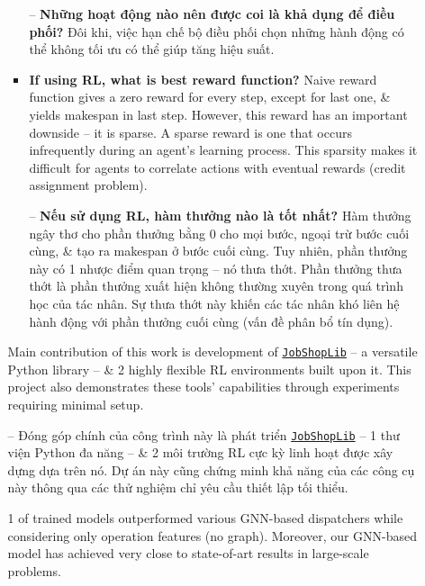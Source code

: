 \documentclass{article}
\begin{document}
\begin{itemize}
\begin{itemize}
\begin{itemize}
            -- {\bf Những hoạt động nào nên được coi là khả dụng để điều phối?} Đôi khi, việc hạn chế bộ điều phối chọn những hành động có thể không tối ưu có thể giúp tăng hiệu suất.
            \item {\bf If using RL, what is best reward function?} Naive reward function gives a zero reward for every step, except for last one, \& yields makespan in last step. However, this reward has an important downside -- it is sparse. A sparse reward is one that occurs infrequently during an agent's learning process. This sparsity makes it difficult for agents to correlate actions with eventual rewards (credit assignment problem).

            -- {\bf Nếu sử dụng RL, hàm thưởng nào là tốt nhất?} Hàm thưởng ngây thơ cho phần thưởng bằng 0 cho mọi bước, ngoại trừ bước cuối cùng, \& tạo ra makespan ở bước cuối cùng. Tuy nhiên, phần thưởng này có 1 nhược điểm quan trọng -- nó thưa thớt. Phần thưởng thưa thớt là phần thưởng xuất hiện không thường xuyên trong quá trình học của tác nhân. Sự thưa thớt này khiến các tác nhân khó liên hệ hành động với phần thưởng cuối cùng (vấn đề phân bổ tín dụng).
        \end{itemize}
        Main contribution of this work is development of \href{https://github.com/Pabloo22/job_shop_lib}{\tt JobShopLib} -- a versatile Python library -- \& 2 highly flexible RL environments built upon it. This project also demonstrates these tools' capabilities through experiments requiring minimal setup.

        -- Đóng góp chính của công trình này là phát triển \href{https://github.com/Pabloo22/job_shop_lib}{\tt JobShopLib} -- 1 thư viện Python đa năng -- \& 2 môi trường RL cực kỳ linh hoạt được xây dựng dựa trên nó. Dự án này cũng chứng minh khả năng của các công cụ này thông qua các thử nghiệm chỉ yêu cầu thiết lập tối thiểu.

        1 of trained models outperformed various GNN-based dispatchers while considering only operation features (no graph). Moreover, our GNN-based model has achieved very close to state-of-art results in large-scale problems.


\end{itemize}
\end{itemize}
\end{document}
